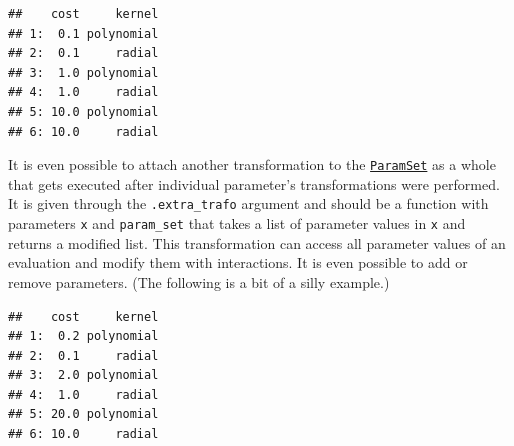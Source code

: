 \documentclass[
]{scrbook}
\newenvironment{Shaded}{\begin{snugshade}}{\end{snugshade}}
\newcommand{\AttributeTok}[1]{\textcolor[rgb]{0.77,0.63,0.00}{#1}}
\newcommand{\ControlFlowTok}[1]{\textcolor[rgb]{0.13,0.29,0.53}{\textbf{#1}}}
\newcommand{\DecValTok}[1]{\textcolor[rgb]{0.00,0.00,0.81}{#1}}
\newcommand{\FunctionTok}[1]{\textcolor[rgb]{0.00,0.00,0.00}{#1}}
\newcommand{\NormalTok}[1]{#1}
\newcommand{\OtherTok}[1]{\textcolor[rgb]{0.56,0.35,0.01}{#1}}
\newcommand{\SpecialCharTok}[1]{\textcolor[rgb]{0.00,0.00,0.00}{#1}}
\newcommand{\StringTok}[1]{\textcolor[rgb]{0.31,0.60,0.02}{#1}}
\renewenvironment{Shaded} {\begin{snugshade}\small} {\end{snugshade}}
\begin{document}
\begin{verbatim}
##    cost     kernel
## 1:  0.1 polynomial
## 2:  0.1     radial
## 3:  1.0 polynomial
## 4:  1.0     radial
## 5: 10.0 polynomial
## 6: 10.0     radial
\end{verbatim}

It is even possible to attach another transformation to the \href{https://paradox.mlr-org.com/reference/ParamSet.html}{\texttt{ParamSet}} as a whole that gets executed after individual parameter's transformations were performed.
It is given through the \texttt{.extra\_trafo} argument and should be a function with parameters \texttt{x} and \texttt{param\_set} that takes a list of parameter values in \texttt{x} and returns a modified list.
This transformation can access all parameter values of an evaluation and modify them with interactions.
It is even possible to add or remove parameters.
(The following is a bit of a silly example.)

\begin{Shaded}
\end{Shaded}

\begin{verbatim}
##    cost     kernel
## 1:  0.2 polynomial
## 2:  0.1     radial
## 3:  2.0 polynomial
## 4:  1.0     radial
## 5: 20.0 polynomial
## 6: 10.0     radial
\end{verbatim}
\end{document}
